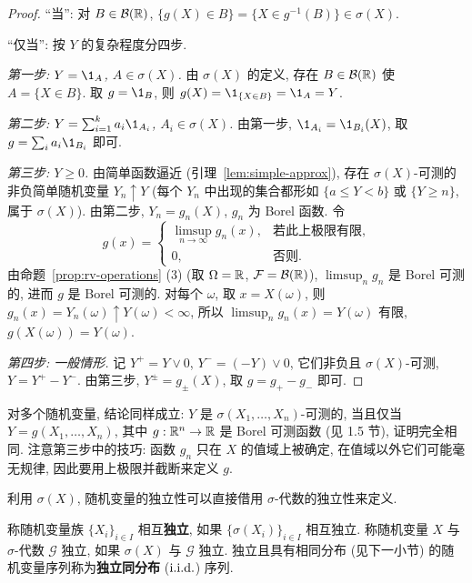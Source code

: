 \begin{proof}
``当'': 对 $B\in\mathcal{B}(\mathbb{R})$, $\{g(X)\in B\}=\{X\in g^{-1}(B)\}\in\sigma(X)$.

``仅当'': 按 $Y$ 的复杂程度分四步.

\emph{第一步: $Y=\1_A$, $A\in\sigma(X)$.} 由 $\sigma(X)$ 的定义, 存在 $B\in\mathcal{B}(\mathbb{R})$ 使 $A=\{X\in B\}$. 取 $g=\1_B$, 则 $g(X)=\1_{\{X\in B\}}=\1_A=Y$.

\emph{第二步: $Y=\sum_{i=1}^k a_i\1_{A_i}$, $A_i\in\sigma(X)$.} 由第一步, $\1_{A_i}=\1_{B_i}(X)$, 取 $g=\sum_i a_i\1_{B_i}$ 即可.

\emph{第三步: $Y\ge0$.} 由简单函数逼近 (引理~\ref{lem:simple-approx}), 存在 $\sigma(X)$-可测的非负简单随机变量 $Y_n\uparrow Y$ (每个 $Y_n$ 中出现的集合都形如 $\{a\le Y<b\}$ 或 $\{Y\ge n\}$, 属于 $\sigma(X)$). 由第二步, $Y_n=g_n(X)$, $g_n$ 为 Borel 函数. 令
\[
g(x)=\begin{cases}\limsup_{n\to\infty}g_n(x), & \text{若此上极限有限},\\ 0, & \text{否则}.\end{cases}
\]
由命题~\ref{prop:rv-operations} (3) (取 $\Omega=\mathbb{R}$, $\mathcal{F}=\mathcal{B}(\mathbb{R})$), $\limsup_n g_n$ 是 Borel 可测的, 进而 $g$ 是 Borel 可测的. 对每个 $\omega$, 取 $x=X(\omega)$, 则 $g_n(x)=Y_n(\omega)\uparrow Y(\omega)<\infty$, 所以 $\limsup_n g_n(x)=Y(\omega)$ 有限, $g(X(\omega))=Y(\omega)$.

\emph{第四步: 一般情形.} 记 $Y^+=Y\vee0$, $Y^-=(-Y)\vee0$, 它们非负且 $\sigma(X)$-可测, $Y=Y^+-Y^-$. 由第三步, $Y^\pm=g_\pm(X)$, 取 $g=g_+-g_-$ 即可.
\end{proof}

\begin{remark}
对多个随机变量, 结论同样成立: $Y$ 是 $\sigma(X_1,\dots,X_n)$-可测的, 当且仅当 $Y=g(X_1,\dots,X_n)$, 其中 $g:\mathbb{R}^n\to\mathbb{R}$ 是 Borel 可测函数 (见 1.5 节), 证明完全相同. 注意第三步中的技巧: 函数 $g_n$ 只在 $X$ 的值域上被确定, 在值域以外它们可能毫无规律, 因此要用上极限并截断来定义 $g$.
\end{remark}

利用 $\sigma(X)$, 随机变量的独立性可以直接借用 $\sigma$-代数的独立性来定义.

\begin{definition}[随机变量的独立性]\label{def:indep-rv}
称随机变量族 $\{X_i\}_{i\in I}$ 相互\textbf{独立}, 如果 $\{\sigma(X_i)\}_{i\in I}$ 相互独立. 称随机变量 $X$ 与 $\sigma$-代数 $\mathcal{G}$ 独立, 如果 $\sigma(X)$ 与 $\mathcal{G}$ 独立. 独立且具有相同分布 (见下一小节) 的随机变量序列称为\textbf{独立同分布} ($\text{i.i.d.}$) 序列.
\end{definition}

